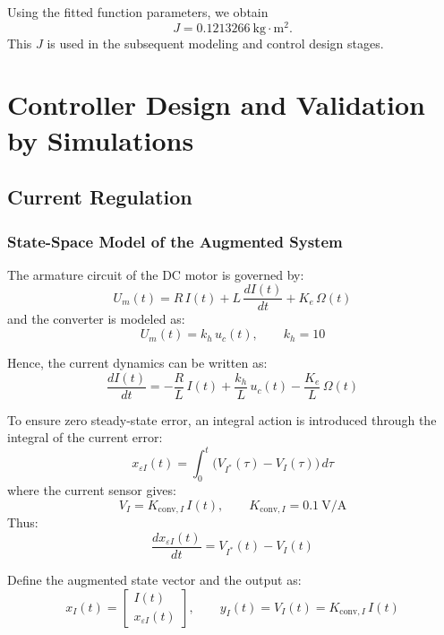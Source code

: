 \documentclass{rapportCS}
\begin{document}
\noindent
Using the fitted function parameters, we obtain
\[
\boxed{J = 0.1213266~\mathrm{kg\cdot m^2}}.
\]
This $J$ is used in the subsequent modeling and control design stages.



\newpage

\section{Controller Design and Validation by Simulations}

\subsection{Current Regulation}
\subsubsection{State-Space Model of the Augmented System}

The armature circuit of the DC motor is governed by:
\begin{equation*}
U_m(t) = R\,I(t) + L\,\frac{dI(t)}{dt} + K_e\,\Omega(t)
\end{equation*}
and the converter is modeled as:
\begin{equation*}
U_m(t) = k_h\,u_c(t), \qquad k_h = 10
\end{equation*}

Hence, the current dynamics can be written as:
\begin{equation*}
\frac{dI(t)}{dt} = -\frac{R}{L}\,I(t) + \frac{k_h}{L}\,u_c(t) - \frac{K_e}{L}\,\Omega(t)
\end{equation*}

To ensure zero steady-state error, an integral action is introduced through the integral of the current error:
\begin{equation*}
x_{\varepsilon I}(t) = \int_0^t \big(V_{I^*}(\tau) - V_I(\tau)\big)\,d\tau
\end{equation*}
where the current sensor gives:
\begin{equation*}
V_I = K_{\mathrm{conv},I}\,I(t), \qquad K_{\mathrm{conv},I} = 0.1~\text{V/A}
\end{equation*}
Thus:
\begin{equation*}
\frac{dx_{\varepsilon I}(t)}{dt} = V_{I^*}(t) - V_I(t)
\end{equation*}

Define the augmented state vector and the output as:
\begin{equation*}
x_I(t) =
\begin{bmatrix}
I(t) \\[4pt]
x_{\varepsilon I}(t)
\end{bmatrix},
\qquad
y_I(t) = V_I(t) = K_{\mathrm{conv},I}\,I(t)
\end{equation*}
\end{document}
